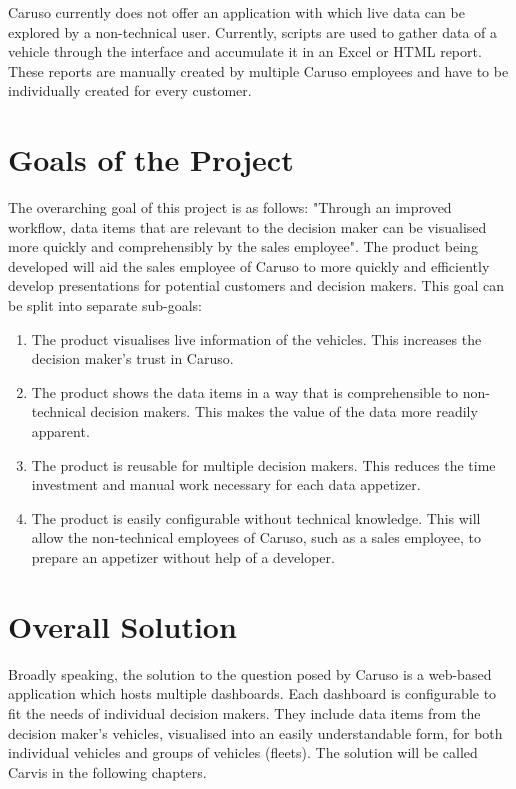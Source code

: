Caruso currently does not offer an application with which live data can be explored by a non-technical user. Currently, scripts are used to gather data of a vehicle through the interface and accumulate it in an Excel or HTML report. These reports are manually created by multiple Caruso employees and have to be individually created for every customer.

\section{Goals of the Project}
The overarching goal of this project is as follows: "Through an improved workflow, data items that are relevant to the decision maker can be visualised more quickly and comprehensibly by the sales employee". The product being developed will aid the sales employee of Caruso to more quickly and efficiently develop presentations for potential customers and decision makers. This goal can be split into separate sub-goals: 
\begin{enumerate}
  \item The product visualises live information of the vehicles. This increases the decision maker's trust in Caruso.
  \item The product shows the data items in a way that is comprehensible to non-technical decision makers. This makes the value of the data more readily apparent.
  \item The product is reusable for multiple decision makers. This reduces the time investment and manual work necessary for each data appetizer.
  \item The product is easily configurable without technical knowledge. This will allow the non-technical employees of Caruso, such as a sales employee, to prepare an appetizer without help of a developer.
\end{enumerate}

\section{Overall Solution}
Broadly speaking, the solution to the question posed by Caruso is a web-based application which hosts multiple dashboards. Each dashboard is configurable to fit the needs of individual decision makers. They include data items from the decision maker's vehicles, visualised into an easily understandable form, for both individual vehicles and groups of vehicles (fleets). The solution will be called Carvis in the following chapters.
